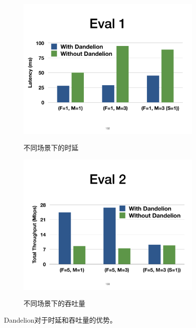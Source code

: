 \begin{figure}[!htbp]
\centering

  \begin{subfigure}[b]{\linewidth}
      \includegraphics[width=\linewidth]{figures/ss-eval1.pdf}
      \label{fig:eval1}
      \caption{不同场景下的时延}
  \end{subfigure}


  \begin{subfigure}[b]{\linewidth}
      \includegraphics[width=\linewidth]{figures/ss-eval2.pdf}
      \label{fig:eval2}
      \caption{不同场景下的吞吐量}
  \end{subfigure}

\caption{Dandelion对于时延和吞吐量的优势。}
\label{fig:eval12}
\end{figure}




